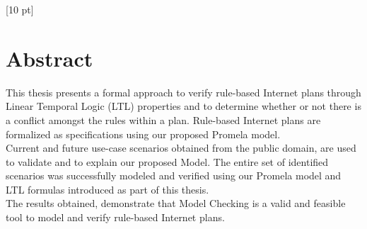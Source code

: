 \titleformat{\chapter}{\Huge\bfseries}{\thechapter}{0 pt}{\rule{340 pt}{3 pt}\\}
\titlespacing{\chapter}{100 pt}{-25 pt}{40 pt}[10 pt]	
\pagestyle{fancy}
\fancyhead[RO,RE]{\thepage}
\fancyfoot[CO,CE]{}

\chapter*{Abstract}


\normalsize
\noindent
This thesis presents a formal approach to verify rule-based Internet plans through Linear Temporal Logic (LTL) properties and to determine whether or not there is a conflict amongst the rules within a plan. Rule-based Internet plans are formalized as specifications using our proposed Promela model. \\

Current and future use-case scenarios obtained from the public domain, are used to validate and to explain our proposed Model. The entire set of identified scenarios was successfully modeled and verified using our Promela model and LTL formulas introduced as part of this thesis. \\

The results obtained, demonstrate that Model Checking is a valid and feasible tool to model and verify rule-based Internet plans. 
\\


\clearpage